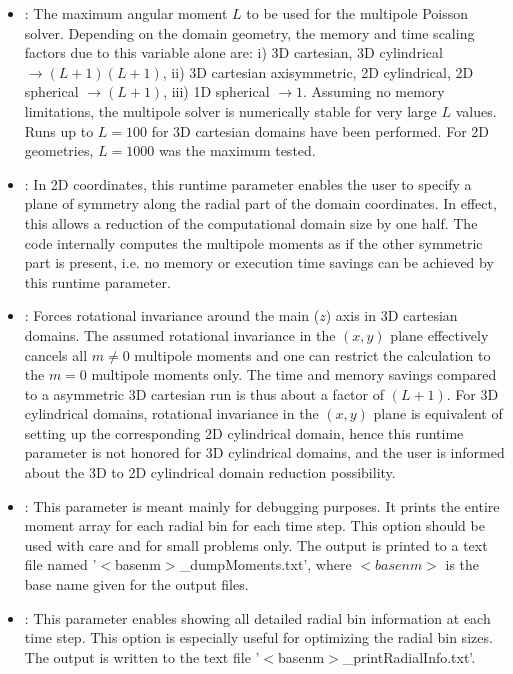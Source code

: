 \begin{itemize}
\item
{}: The maximum angular moment $L$ to be used for the multipole
Poisson solver. Depending on the domain geometry, the memory and time scaling factors
due to this variable alone are: i) 3D cartesian, 3D cylindrical $\rightarrow (L+1)(L+1)$, ii)
3D cartesian axisymmetric, 2D cylindrical, 2D spherical $\rightarrow (L+1)$,
iii) 1D spherical $\rightarrow 1$. Assuming no memory limitations, the multipole
solver is numerically stable for very large $L$ values. Runs up to $L=100$
for 3D cartesian domains have been performed. For 2D geometries, $L=1000$ was the
maximum tested.
\item
{}: In 2D coordinates, this runtime parameter
enables the user to specify a plane of symmetry along the radial part of the
domain coordinates. In effect, this allows a reduction of the computational
domain size by one half. The code internally computes the multipole moments as if the
other symmetric part is present, i.e. no memory or execution time savings
can be achieved by this runtime parameter.
\item
{}: Forces rotational invariance around the main ($z$)
axis in 3D cartesian domains. The assumed rotational invariance in the $(x,y)$
plane effectively cancels all $m\neq 0$ multipole moments and one can restrict
the calculation to the $m=0$ multipole moments only. The time and memory
savings compared to a asymmetric 3D cartesian run is thus about a factor
of $(L+1)$. For 3D cylindrical domains, rotational invariance in the $(x,y)$
plane is equivalent of setting up the corresponding 2D cylindrical domain,
hence this runtime parameter is not honored for 3D cylindrical domains, and
the user is informed about the 3D to 2D cylindrical domain reduction possibility.
\item
{}: This parameter is meant mainly for debugging purposes.
It prints the entire moment array for each radial bin for each time step.
This option should be used with care and for small problems only. The output
is printed to a text file named '$<$basenm$>$\_dumpMoments.txt', where $<basenm>$
is the base name given for the output files.
\item
{}: This parameter enables showing all detailed radial
bin information at each time step. This option is especially useful for optimizing
the radial bin sizes. The output is written to the text file '$<$basenm$>$\_printRadialInfo.txt'.

\end{itemize}
